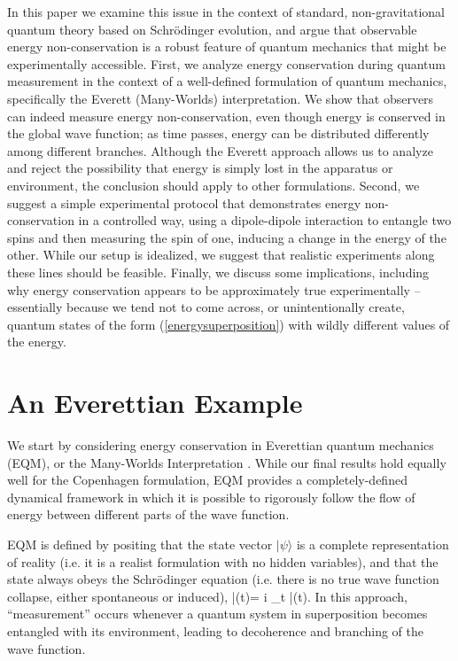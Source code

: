 \documentclass[12pt,aps,prd,onecolumn,nofootinbib,notitlepage]{revtex4-1}
\begin{document}
In this paper we examine this issue in the context of standard, non-gravitational quantum theory based on Schr\"odinger evolution, and argue that observable energy non-conservation is a robust feature of quantum mechanics that might be experimentally accessible.
First, we analyze energy conservation during quantum measurement in the context of a well-defined formulation of quantum mechanics, specifically the Everett (Many-Worlds) interpretation.
We show that observers can indeed measure energy non-conservation, even though energy is conserved in the global wave function; as time passes, energy can be distributed differently among different branches.
Although the Everett approach allows us to analyze and reject the possibility that energy is simply lost in the apparatus or environment, the conclusion should apply to other formulations.
Second, we suggest a simple experimental protocol that demonstrates energy non-conservation in a controlled way, using a dipole-dipole interaction to entangle two spins and then measuring the spin of one, inducing a change in the energy of the other.
While our setup is idealized, we suggest that realistic experiments along these lines should be feasible.
Finally, we discuss some implications, including why energy conservation appears to be approximately true experimentally -- essentially because we tend not to come across, or unintentionally create, quantum states of the form (\ref{energysuperposition}) with wildly different values of the energy.

\section{An Everettian Example}

We start by considering energy conservation in Everettian quantum mechanics (EQM), or the Many-Worlds Interpretation \cite{Everett:1957hd,Wallace:2012zla}.
While our final results hold equally well for the Copenhagen formulation, EQM provides a completely-defined dynamical framework in which it is possible to rigorously follow the flow of energy between different parts of the wave function.

EQM is defined by positing that the state vector $|\psi\rangle$ is a complete representation of reality (i.e. it is a realist formulation with no hidden variables), and that the state always obeys the Schr\"odinger equation (i.e. there is no true wave function collapse, either spontaneous or induced),
\be
  \ham |\psi(t)\rangle = i \partial_t |\psi(t)\rangle.
\ee
In this approach, ``measurement'' occurs whenever a quantum system in superposition becomes entangled with its environment, leading to decoherence and branching of the wave function.
\end{document}
